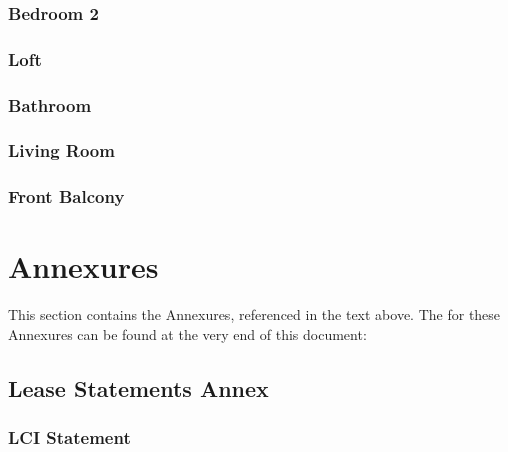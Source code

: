 \documentclass[letterpaper,10pt,openany,oneside,russian]{sphinxmanual}
\begin{document}
\subsection{Bedroom 2}
\label{\detokenize{categories:bedroom-2}}

\subsection{Loft}
\label{\detokenize{categories:loft}}

\subsection{Bathroom}
\label{\detokenize{categories:bathroom}}

\subsection{Living Room}
\label{\detokenize{categories:living-room}}

\subsection{Front Balcony}
\label{\detokenize{categories:front-balcony}}

\chapter{Annexures}
\label{\detokenize{annex:annexures}}\label{\detokenize{annex::doc}}
\sphinxAtStartPar
This section contains the Annexures, referenced in the text above.
The {\hyperref[\detokenize{annex:download-links}]{}} for these Annexures can be found at the very end of this document:


\section{Lease Statements Annex}
\label{\detokenize{annex:lease-statements-annex}}

\subsection{LC\sphinxhyphen{}I Statement}
\label{\detokenize{annex:lc-i-statement}}
\end{document}

